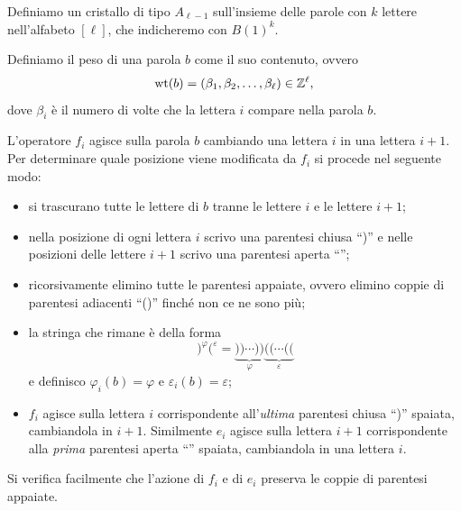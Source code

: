 \begin{example}
    \label{ex:crys_word}
    Definiamo un cristallo di tipo $A_{\ell-1}$ sull'insieme delle parole
    con $k$ lettere nell'alfabeto $[\ell]$, che indicheremo con $B(1)^k$.

    Definiamo il peso di una parola $b$ come il suo contenuto, ovvero 
    \[
        \operatorname{wt}(b) = (\beta_1, \beta_2, \dots, \beta_\ell) \in \mathbb{Z}^\ell,
    \]
    dove $\beta_i$ \`e il numero di volte che la lettera $i$ compare nella parola $b$.

    L'operatore $f_i$ agisce sulla parola $b$ cambiando una lettera $i$ in una lettera $i+1$.
    Per determinare quale posizione viene modificata da $f_i$ si procede nel seguente modo:
    \begin{itemize}
        \item si trascurano tutte le lettere di $b$ tranne le lettere $i$ e le lettere $i+1$;
        \item nella posizione di ogni lettera $i$ scrivo una parentesi chiusa ``)'' e 
            nelle posizioni delle lettere $i+1$ scrivo una parentesi aperta ``\lparen'';
        \item ricorsivamente elimino tutte le parentesi appaiate, ovvero elimino coppie
            di parentesi adiacenti ``()'' finch\'e non ce ne sono pi\`u;
        \item la stringa che rimane \`e della forma 
            \[
                )^\varphi \lparen^\varepsilon 
                {}={}
                \underbrace{)) \cdots ))}_\varphi
                \underbrace{\lparen\lparen \cdots \lparen\lparen}_\varepsilon
            \]
            e definisco $\varphi_i(b) = \varphi$ e $\varepsilon_i(b) = \varepsilon$;
        \item $f_i$ agisce sulla lettera $i$ corrispondente all'\emph{ultima} parentesi
            chiusa ``)'' spaiata, cambiandola in $i+1$.
            Similmente $e_i$ agisce sulla lettera $i+1$ corrispondente alla \emph{prima}
            parentesi aperta ``\lparen'' spaiata, cambiandola in una lettera $i$.
    \end{itemize}

    Si verifica facilmente che l'azione di $f_i$ e di $e_i$ preserva le coppie di parentesi
    appaiate.

\end{example}

